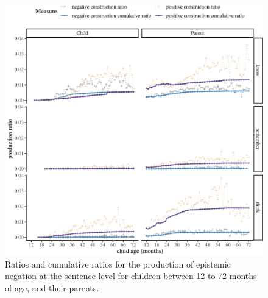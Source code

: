 \documentclass[
  english,
  man,floatsintext]{apa6}
\begin{document}
\begin{figure}[H]

{\centering \includegraphics{neg_construction_article_files/figure-latex/epistemic-1} 

}

\caption{Ratios and cumulative ratios for the production of epistemic negation at the sentence level for children between 12 to 72 months of age, and their parents.}\label{fig:epistemic}
\end{figure}
\end{document}
